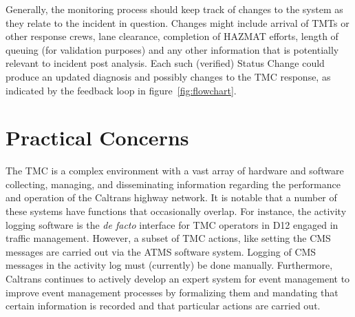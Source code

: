 \documentclass[12pt]{report}
\begin{document}
Generally, the monitoring process should keep track of changes to the
system as they relate to the incident in question.  Changes might
include arrival of \ac{TMT}s or other response crews, lane clearance,
completion of \ac{HAZMAT} efforts, length of queuing (for validation
purposes) and any other information that is potentially relevant to
incident post analysis.  Each such (verified) {\sc Status Change}
could produce an updated diagnosis and possibly changes to the
\ac{TMC} response, as indicated by the feedback loop in
figure~\ref{fig:flowchart}.


\section{Practical Concerns}
\label{sec:practical-concerns}

The \ac{TMC} is a complex environment with a vast array of hardware
and software collecting, managing, and disseminating information
regarding the performance and operation of the Caltrans highway
network.  It is notable that a number of these systems have functions
that occasionally overlap.  For instance, the activity logging
software is the \emph{de facto} interface for \ac{TMC} operators in
\ac{D12} engaged in traffic management.  However, a subset of \ac{TMC}
actions, like setting the \ac{CMS} messages are carried out via the
\ac{ATMS} software system.  Logging of \ac{CMS} messages in the
activity log must (currently) be done manually.  Furthermore, Caltrans
continues to actively develop an expert system for event management to
improve event management processes by formalizing them and mandating
that certain information is recorded and that particular actions are
carried out.
\end{document}

